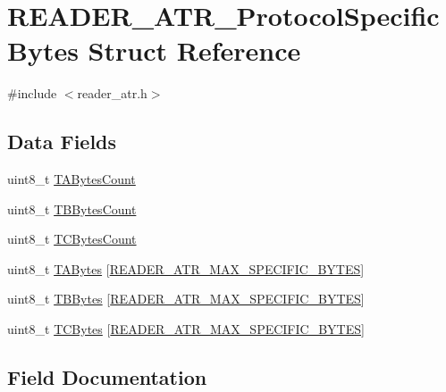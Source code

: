 \hypertarget{struct_r_e_a_d_e_r___a_t_r___protocol_specific_bytes}{}\section{R\+E\+A\+D\+E\+R\+\_\+\+A\+T\+R\+\_\+\+Protocol\+Specific\+Bytes Struct Reference}
\label{struct_r_e_a_d_e_r___a_t_r___protocol_specific_bytes}


{\ttfamily \#include $<$reader\+\_\+atr.\+h$>$}

\subsection*{Data Fields}
\begin{DoxyCompactItemize}
\item 
uint8\+\_\+t \hyperlink{struct_r_e_a_d_e_r___a_t_r___protocol_specific_bytes_a3bb85da59a5096e1b450cbce54733478}{T\+A\+Bytes\+Count}
\item 
uint8\+\_\+t \hyperlink{struct_r_e_a_d_e_r___a_t_r___protocol_specific_bytes_a1994caa40b881fecd6d791f727055a6c}{T\+B\+Bytes\+Count}
\item 
uint8\+\_\+t \hyperlink{struct_r_e_a_d_e_r___a_t_r___protocol_specific_bytes_ab9bb2af6efe5aae109843efabe3a204f}{T\+C\+Bytes\+Count}
\item 
uint8\+\_\+t \hyperlink{struct_r_e_a_d_e_r___a_t_r___protocol_specific_bytes_ad7b5edf79261941307ee7545b6cd88c0}{T\+A\+Bytes} \mbox{[}\hyperlink{reader__atr_8h_ab72f8cd7d1234d9173796c516f94671f}{R\+E\+A\+D\+E\+R\+\_\+\+A\+T\+R\+\_\+\+M\+A\+X\+\_\+\+S\+P\+E\+C\+I\+F\+I\+C\+\_\+\+B\+Y\+T\+ES}\mbox{]}
\item 
uint8\+\_\+t \hyperlink{struct_r_e_a_d_e_r___a_t_r___protocol_specific_bytes_a7f1c1c4eb03d88718b259e4c046139e3}{T\+B\+Bytes} \mbox{[}\hyperlink{reader__atr_8h_ab72f8cd7d1234d9173796c516f94671f}{R\+E\+A\+D\+E\+R\+\_\+\+A\+T\+R\+\_\+\+M\+A\+X\+\_\+\+S\+P\+E\+C\+I\+F\+I\+C\+\_\+\+B\+Y\+T\+ES}\mbox{]}
\item 
uint8\+\_\+t \hyperlink{struct_r_e_a_d_e_r___a_t_r___protocol_specific_bytes_a920fd664683dd872638a69afea315fc4}{T\+C\+Bytes} \mbox{[}\hyperlink{reader__atr_8h_ab72f8cd7d1234d9173796c516f94671f}{R\+E\+A\+D\+E\+R\+\_\+\+A\+T\+R\+\_\+\+M\+A\+X\+\_\+\+S\+P\+E\+C\+I\+F\+I\+C\+\_\+\+B\+Y\+T\+ES}\mbox{]}
\end{DoxyCompactItemize}


\subsection{Field Documentation}
\mbox{\label{struct_r_e_a_d_e_r___a_t_r___protocol_specific_bytes_ad7b5edf79261941307ee7545b6cd88c0}} 
